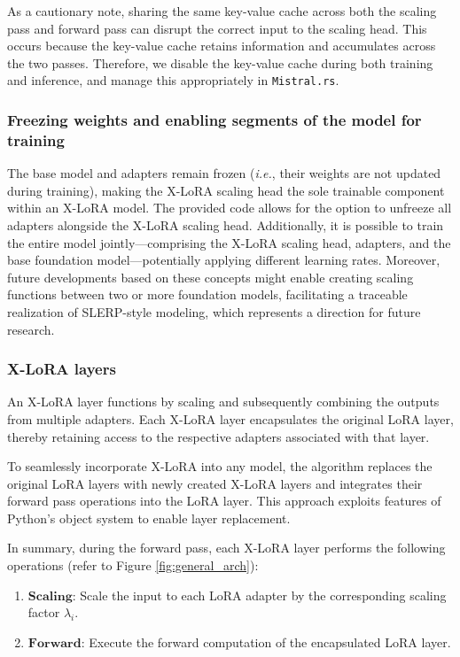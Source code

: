As a cautionary note, sharing the same key-value cache across both the scaling pass and forward pass can disrupt the correct input to the scaling head. This occurs because the key-value cache retains information and accumulates across the two passes. Therefore, we disable the key-value cache during both training and inference, and manage this appropriately in \texttt{Mistral.rs}.

\subsubsection{Freezing weights and enabling segments of the model for training} The base model and adapters remain frozen ({\it i.e.}, their weights are not updated during training), making the X-LoRA scaling head the sole trainable component within an X-LoRA model. The provided code allows for the option to unfreeze all adapters alongside the X-LoRA scaling head. Additionally, it is possible to train the entire model jointly—comprising the X-LoRA scaling head, adapters, and the base foundation model—potentially applying different learning rates. Moreover, future developments based on these concepts might enable creating scaling functions between two or more foundation models, facilitating a traceable realization of SLERP-style modeling, which represents a direction for future research.

\subsubsection{X-LoRA layers} An X-LoRA layer functions by scaling and subsequently combining the outputs from multiple adapters. Each X-LoRA layer encapsulates the original LoRA layer, thereby retaining access to the respective adapters associated with that layer.

To seamlessly incorporate X-LoRA into any model, the algorithm replaces the original LoRA layers with newly created X-LoRA layers and integrates their forward pass operations into the LoRA layer. This approach exploits features of Python's object system to enable layer replacement.

In summary, during the forward pass, each X-LoRA layer performs the following operations (refer to Figure \ref{fig:general_arch}):

\begin{enumerate}
    \item $\mathbf{Scaling}$: Scale the input to each LoRA adapter by the corresponding scaling factor $\lambda_i$.
    \item $\mathbf{Forward}$: Execute the forward computation of the encapsulated LoRA layer.
\end{enumerate}

